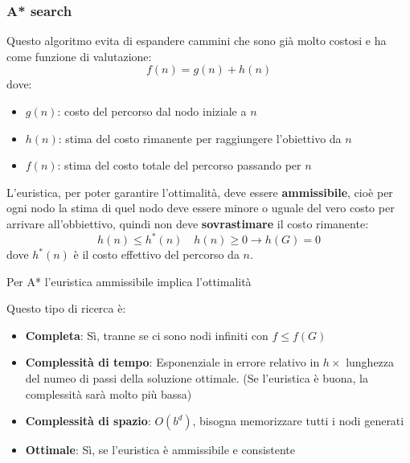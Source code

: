 \documentclass[a4paper]{article}
\begin{document}
\subsubsection{A* search}
Questo algoritmo evita di espandere cammini che sono già molto costosi e ha come
funzione di valutazione:
\[
  f(n) = g(n) + h(n)
\] 
dove:
\begin{itemize}
  \item \( g(n) \): costo del percorso dal nodo iniziale a \( n \)
  \item \( h(n) \): stima del costo rimanente per raggiungere l'obiettivo da \( n \)
  \item \( f(n) \): stima del costo totale del percorso passando per \( n \)
\end{itemize}
L'euristica, per poter garantire l'ottimalità, deve essere \textbf{ammissibile}, cioè
per ogni nodo la stima di quel nodo deve essere minore o uguale del vero costo per arrivare
all'obbiettivo, quindi non deve \textbf{sovrastimare} il costo rimanente:
\[
  h(n) \le h^*(n) \quad h(n) \ge 0 \to h(G) = 0
\] 
dove \( h^*(n) \) è il costo effettivo del percorso da \( n \).
\begin{theorem}
  Per A* l'euristica ammissibile implica l'ottimalità
\end{theorem}
\noindent
Questo tipo di ricerca è:
\begin{itemize}
  \item \textbf{Completa}: Sì, tranne se ci sono nodi infiniti con \( f \le f(G) \) 
  \item \textbf{Complessità di tempo}: Esponenziale in errore relativo in \( h \times  \) 
    lunghezza del numeo di passi della soluzione ottimale. (Se l'euristica è buona, la
    complessità sarà molto più bassa)
  \item \textbf{Complessità di spazio}: \( O(b^d) \), bisogna memorizzare tutti i nodi
    generati
  \item \textbf{Ottimale}: Sì, se l'euristica è ammissibile e consistente
\end{itemize}
\end{document}
